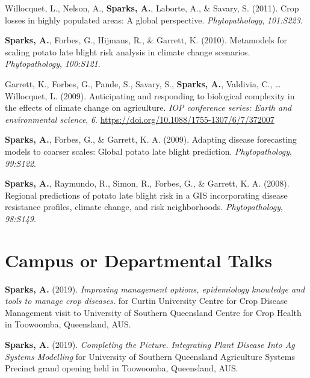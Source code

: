 \documentclass[11pt, a4paper]{awesome-cv}
\begin{document}
\leavevmode{}%
Willocquet, L., Nelson, A., \textbf{Sparks, A.}, Laborte, A., \& Savary,
S. (2011). Crop losses in highly populated areas: {A} global
perspective. \emph{Phytopathology}, \emph{101:S223}.

\leavevmode{}%
\textbf{Sparks, A.}, Forbes, G., Hijmans, R., \& Garrett, K. (2010).
Metamodels for scaling potato late blight risk analysis in climate
change scenarios. \emph{Phytopathology}, \emph{100:S121}.

\leavevmode{}%
Garrett, K., Forbes, G., Pande, S., Savary, S., \textbf{Sparks, A.},
Valdivia, C., \ldots{} Willocquet, L. (2009). Anticipating and
responding to biological complexity in the effects of climate change on
agriculture. \emph{IOP conference series: Earth and environmental
science}, \emph{6}. \url{https://doi.org/10.1088/1755-1307/6/7/372007}

\leavevmode{}%
\textbf{Sparks, A.}, Forbes, G., \& Garrett, K. A. (2009). Adapting
disease forecasting models to coarser scales: {Global} potato late
blight prediction. \emph{Phytopathology}, \emph{99:S122}.

\leavevmode{}%
\textbf{Sparks, A.}, Raymundo, R., Simon, R., Forbes, G., \& Garrett, K.
A. (2008). Regional predictions of potato late blight risk in a {GIS}
incorporating disease resistance profiles, climate change, and risk
neighborhoods. \emph{Phytopathology}, \emph{98:S149}.

\endgroup

\hypertarget{campus-or-departmental-talks}{%
\section{Campus or Departmental
Talks}\label{campus-or-departmental-talks}}

\begingroup
\setlength{\parindent}{-0.5in}
\setlength{\leftskip}{0.5in}

\textbf{Sparks, A.} (2019). \emph{Improving management options,
epidemiology knowledge and tools to manage crop diseases.} for Curtin
University Centre for Crop Disease Management visit to University of
Southern Queensland Centre for Crop Health in Toowoomba, Queensland,
AUS.

\textbf{Sparks, A.} (2019). \emph{Completing the Picture. Integrating
Plant Disease Into Ag Systems Modelling} for University of Southern
Queensland Agriculture Systems Precinct grand opening held in Toowoomba,
Queensland, AUS.
\end{document}
